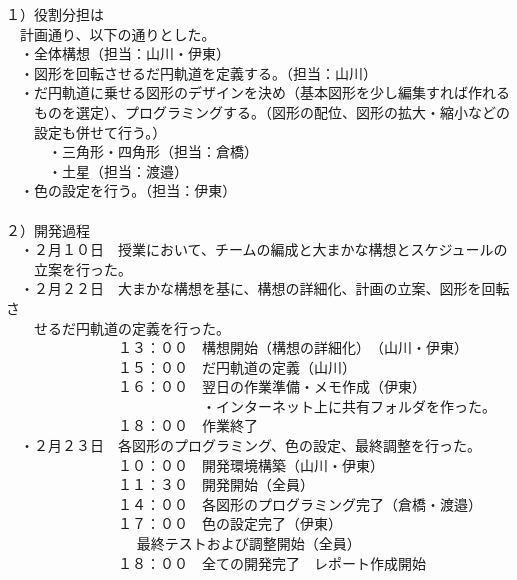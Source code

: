 \documentclass[12pt,a4j]{jarticle}
\begin{document}
１）役割分担は\\
　計画通り、以下の通りとした。\\
　・全体構想（担当：山川・伊東）\\
　・図形を回転させるだ円軌道を定義する。（担当：山川）\\
　・だ円軌道に乗せる図形のデザインを決め（基本図形を少し編集すれば作れる\\
　　ものを選定）、プログラミングする。（図形の配位、図形の拡大・縮小などの\\
　　設定も併せて行う。）\\
　　　・三角形・四角形（担当：倉橋）\\
　　　・土星（担当：渡邉）\\
　・色の設定を行う。（担当：伊東）\\
\\
２）開発過程\\
　・２月１０日　授業において、チームの編成と大まかな構想とスケジュールの\\
　　立案を行った。\\
　・２月２２日　大まかな構想を基に、構想の詳細化、計画の立案、図形を回転さ\\
　　せるだ円軌道の定義を行った。\\
　　　　　　　　１３：００　構想開始（構想の詳細化）　（山川・伊東）\\
　　　　　　　　１５：００　だ円軌道の定義（山川）\\
　　　　　　　　１６：００　翌日の作業準備・メモ作成（伊東）\\
　　　　　　　　　　　　　　・インターネット上に共有フォルダを作った。\\
　　　　　　　　１８：００　作業終了\\
　・２月２３日　各図形のプログラミング、色の設定、最終調整を行った。\\
　　　　　　　　１０：００　開発環境構築（山川・伊東）\\
　　　　　　　　１１：３０　開発開始（全員）\\
　　　　　　　　１４：００　各図形のプログラミング完了（倉橋・渡邉）\\
　　　　　　　　１７：００　色の設定完了（伊東）\\
        　　　　　　　　　 最終テストおよび調整開始（全員）\\
　　　　　　　　１８：００　全ての開発完了　レポート作成開始\\
\end{document}
